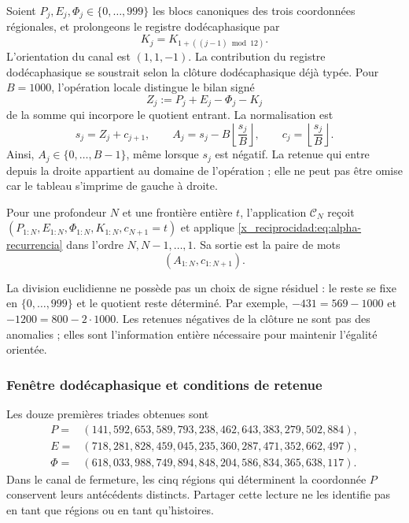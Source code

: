Soient \(P_j,E_j,\Phi_j\in\{0,\ldots,999\}\) les blocs canoniques des
trois coordonnées régionales, et prolongeons le registre dodécaphasique par
\[
 K_j=K_{1+((j-1)\bmod12)}.
\]
L'orientation du canal est \((1,1,-1)\). La contribution du registre dodécaphasique se soustrait selon la clôture dodécaphasique déjà typée. Pour \(B=1000\), l'opération locale distingue le bilan signé
\[
 Z_j:=P_j+E_j-\Phi_j-K_j
\]
de la somme qui incorpore le quotient entrant. La normalisation est
\begin{equation}
 s_j=Z_j+c_{j+1},\qquad
 A_j=s_j-B\left\lfloor\frac{s_j}{B}\right\rfloor,
 \qquad c_j=\left\lfloor\frac{s_j}{B}\right\rfloor.
 \label{x_reciprocidad:eq:alpha-recurrencia}
\end{equation}
Ainsi, \(A_j\in\{0,\ldots,B-1\}\), même lorsque \(s_j\) est
négatif. La retenue qui entre depuis la droite appartient au domaine de
l'opération ; elle ne peut pas être omise car le tableau s'imprime de gauche
à droite.

\begin{definition}
\label{x_reciprocidad:def:alpha-finita}
Pour une profondeur \(N\) et une frontière entière \(t\), l'application
\(\mathcal C_N\) reçoit
\((P_{1:N},E_{1:N},\Phi_{1:N},K_{1:N},c_{N+1}=t)\) et applique
\eqref{x_reciprocidad:eq:alpha-recurrencia} dans l'ordre \(N,N-1,\ldots,1\). Sa sortie
est la paire de mots
\[
 (A_{1:N},c_{1:N+1}).
\]
\end{definition}

La division euclidienne ne possède pas un choix de signe résiduel : le reste se
fixe en \(\{0,\ldots,999\}\) et le quotient reste déterminé. Par
exemple, \(-431=569-1000\) et \(-1200=800-2\cdot1000\). Les
retenues négatives de la clôture ne sont pas des anomalies ; elles sont l'information
entière nécessaire pour maintenir l'égalité orientée.

\subsubsection{Fenêtre dodécaphasique et conditions de retenue}
\label{x_reciprocidad:subsec:alpha-ventana}

Les douze premières triades obtenues sont
\begin{align*}
 P={}&(141,592,653,589,793,238,462,643,383,279,502,884),\\
 E={}&(718,281,828,459,045,235,360,287,471,352,662,497),\\
 \Phi={}&(618,033,988,749,894,848,204,586,834,365,638,117).
\end{align*}
Dans le canal de fermeture, les cinq régions qui déterminent la coordonnée \(P\) conservent leurs antécédents distincts. Partager cette lecture ne les identifie pas en tant que régions ou en tant qu'histoires.

